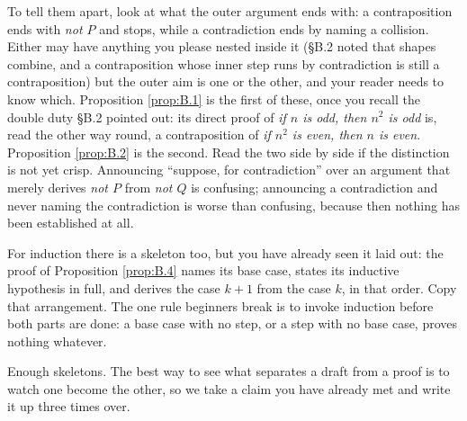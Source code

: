 \documentclass[a4paper,12pt,oneside]{memoir}
\begin{document}
To tell them apart, look at what the outer argument ends with: a contraposition ends with \emph{not \(P\)} and stops, while a contradiction ends by naming a collision. Either may have anything you please nested inside it (§B.2 noted that shapes combine, and a contraposition whose inner step runs by contradiction is still a contraposition) but the outer aim is one or the other, and your reader needs to know which. Proposition \ref{prop:B.1} is the first of these, once you recall the double duty §B.2 pointed out: its direct proof of \emph{if \(n\) is odd, then \(n^{2}\) is odd} is, read the other way round, a contraposition of \emph{if \(n^{2}\) is even, then \(n\) is even}. Proposition \ref{prop:B.2} is the second. Read the two side by side if the distinction is not yet crisp. Announcing “suppose, for contradiction” over an argument that merely derives \emph{not \(P\)} from \emph{not \(Q\)} is confusing; announcing a contradiction and never naming the contradiction is worse than confusing, because then nothing has been established at all.

For induction there is a skeleton too, but you have already seen it laid out: the proof of Proposition \ref{prop:B.4} names its base case, states its inductive hypothesis in full, and derives the case \(k + 1\) from the case \(k\), in that order. Copy that arrangement. The one rule beginners break is to invoke induction before both parts are done: a base case with no step, or a step with no base case, proves nothing whatever.

Enough skeletons. The best way to see what separates a draft from a proof is to watch one become the other, so we take a claim you have already met and write it up three times over.
\end{document}
